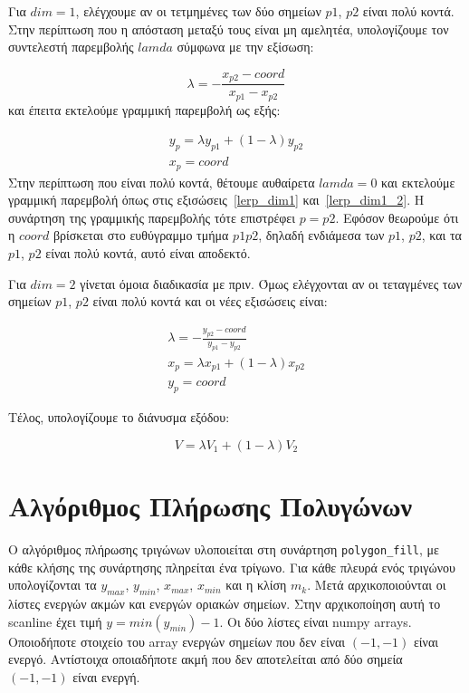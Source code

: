 \documentclass{article}
\begin{document}
Για $dim = 1$, ελέγχουμε αν οι τετμημένες των δύο σημείων 
$p1$, $p2$ είναι πολύ κοντά. Στην περίπτωση που η απόσταση μεταξύ τους είναι μη αμελητέα,
υπολογίζουμε τον συντελεστή παρεμβολής $lamda$ σύμφωνα με την εξίσωση:

\begin{equation}
    \lambda = - \frac{x_{p2} - coord}{x_{p1} - x_{p2}}
\end{equation}
και έπειτα εκτελούμε γραμμική παρεμβολή ως εξής:

\begin{gather}
    y_p = \lambda y_{p1} + (1-\lambda) y_{p2}\label{lerp_dim1} \\
    x_p = coord\label{lerp_dim1_2}
\end{gather}
Στην περίπτωση που είναι πολύ κοντά, θέτουμε αυθαίρετα
$lamda = 0$ και εκτελούμε γραμμική παρεμβολή όπως στις
εξισώσεις~\ref{lerp_dim1} και~\ref{lerp_dim1_2}. Η συνάρτηση της γραμμικής παρεμβολής 
τότε επιστρέφει $p = p2$. Εφόσον θεωρούμε ότι η $coord$ βρίσκεται στο
ευθύγραμμο τμήμα $p1p2$, δηλαδή ενδιάμεσα των $p1$, $p2$, 
και τα $p1$, $p2$ είναι πολύ κοντά, αυτό είναι αποδεκτό.

Για $dim = 2$ γίνεται όμοια διαδικασία με πριν. Όμως ελέγχονται
αν οι τεταγμένες των σημείων $p1$, $p2$ είναι πολύ κοντά και οι νέες 
εξισώσεις είναι:

\begin{gather}
    \lambda = - \frac{y_{p2} - coord}{y_{p1} - y_{p2}}\\
    x_p = \lambda x_{p1} + (1-\lambda) x_{p2}\label{lerp_dim2} \\
    y_p = coord\label{lerp_dim2_2}
\end{gather}

Τέλος, υπολογίζουμε το διάνυσμα εξόδου:

\begin{equation}
    V = \lambda V_{1} + (1-\lambda) V_{2}
\end{equation}

\section{Αλγόριθμος Πλήρωσης Πολυγώνων}
Ο αλγόριθμος πλήρωσης τριγώνων υλοποιείται στη συνάρτηση \verb|polygon_fill|,
με κάθε κλήσης της συνά\-ρτησης πληρείται ένα τρίγωνο. Για κάθε πλευρά ενός 
τριγώνου υπολογίζονται τα $y_{max}$, $y_{min}$, $x_{max}$, $x_{min}$ 
και η κλίση $m_k$. Μετά αρχικοποιούνται οι λίστες ενεργών ακμών και ενεργών 
οριακών σημείων. Στην αρχικοποίηση αυτή το scanline έχει τιμή $y = min(y_{min}) - 1$.
Οι δύο λίστες είναι numpy arrays. Οποιοδήποτε στοιχείο του array ενεργών σημείων που δεν 
είναι $(-1, -1)$ είναι ενεργό. Αντίστοιχα οποιαδήποτε ακμή που δεν αποτελείται από 
δύο σημεία $(-1, -1)$ είναι ενεργή.
\end{document}
